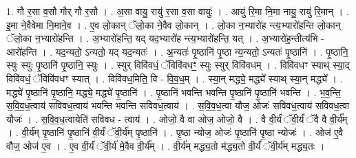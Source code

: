 \documentclass[17pt]{extarticle}
\begin{document}
1. गौ र॒सा व॒सौ गौर् गौ र॒सौ । . अ॒सा वायु॒ रायु॑ र॒सा व॒सा वायुः॑ । . आयु॑ रि॒मा नि॒मा नायु॒ रायु॑ रि॒मान् । . इ॒मा ने॒वैवेमा नि॒माने॒व । . ए॒व लो॒कान् ॅलो॒का ने॒वैव लो॒कान् । . लो॒का न॒भ्यारो॑ह न्त्य॒भ्यारो॑हन्ति लो॒कान् ॅलो॒का न॒भ्यारो॑हन्ति । . अ॒भ्यारो॑हन्ति॒ यद् यद॒भ्यारो॑ह न्त्य॒भ्यारो॑हन्ति॒ यत् । . अ॒भ्यारो॑ह॒न्तीत्य॑भि - आरो॑हन्ति । . यद॒न्यतो॒ ऽन्यतो॒ यद् यद॒न्यतः॑ । . अ॒न्यतः॑ पृ॒ष्ठानि॑ पृ॒ष्ठा न्य॒न्यतो॒ ऽन्यतः॑ पृ॒ष्ठानि॑ । . पृ॒ष्ठानि॒ स्युः स्युः पृ॒ष्ठानि॑ पृ॒ष्ठानि॒ स्युः । . स्युर् विवि॑वधं॒ ॅविवि॑वधꣳ॒॒ स्युः स्युर् विवि॑वधम् । . विवि॑वधꣳ स्याथ् स्या॒द् विवि॑वधं॒ ॅविवि॑वधꣳ स्यात् । . विवि॑वध॒मिति॒ वि - वि॒व॒ध॒म् । . स्या॒न् मद्ध्ये॒ मद्ध्ये᳚ स्याथ् स्या॒न् मद्ध्ये᳚ । . मद्ध्ये॑ पृ॒ष्ठानि॑ पृ॒ष्ठानि॒ मद्ध्ये॒ मद्ध्ये॑ पृ॒ष्ठानि॑ । . पृ॒ष्ठानि॑ भवन्ति भवन्ति पृ॒ष्ठानि॑ पृ॒ष्ठानि॑ भवन्ति । . भ॒व॒न्ति॒ स॒वि॒व॒ध॒त्वाय॑ सविवध॒त्वाय॑ भवन्ति भवन्ति सविवध॒त्वाय॑ । . स॒वि॒व॒ध॒त्वा यौज॒ ओजः॑ सविवध॒त्वाय॑ सविवध॒त्वा यौजः॑ । . स॒वि॒व॒ध॒त्वायेति॑ सविवध - त्वाय॑ । . ओजो॒ वै वा ओज॒ ओजो॒ वै । . वै वी॒र्यं॑ ॅवी॒र्यं॑ ॅवै वै वी॒र्य᳚म् । . वी॒र्य॑म् पृ॒ष्ठानि॑ पृ॒ष्ठानि॑ वी॒र्यं॑ ॅवी॒र्य॑म् पृ॒ष्ठानि॑ । . पृ॒ष्ठा न्योज॒ ओजः॑ पृ॒ष्ठानि॑ पृ॒ष्ठा न्योजः॑ । . ओज॑ ए॒वै वौज॒ ओज॑ ए॒व । . ए॒व वी॒र्यं॑ ॅवी॒र्य॑ मे॒वैव वी॒र्य᳚म् । . वी॒र्य॑म् मद्ध्य॒तो म॑द्ध्य॒तो वी॒र्यं॑ ॅवी॒र्य॑म् मद्ध्य॒तः । \newline
\end{document}
